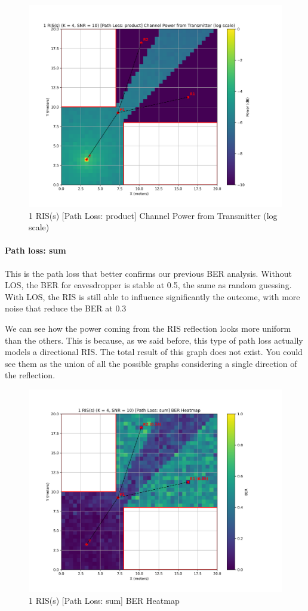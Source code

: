 \begin{figure}[H]
  \centering
  \includegraphics[width=0.7\linewidth]{imgs/heatmap-simulations/1 RIS(s) (K = 4, SNR = 10) [Path Loss_ product] Channel Power from Transmitter (log scale).png}
  \caption{1 RIS(s) [Path Loss: product] Channel Power from Transmitter (log scale)}
\end{figure}

\paragraph*{Path loss: sum}
This is the path loss that better confirms our previous BER analysis. Without LOS, the BER for eavesdropper is stable at 0.5, the same as random guessing. With LOS, the RIS is still able to influence significantly the outcome, with more noise that reduce the BER at 0.3

We can see how the power coming from the RIS reflection looks more uniform than the others. This is because, as we said before, this type of path loss actually models a directional RIS. The total result of this graph does not exist. You could see them as the union of all the possible graphs considering a single direction of the reflection.

\begin{figure}[H]
  \centering
  \includegraphics[width=0.7\linewidth]{imgs/heatmap-simulations/1 RIS(s) (K = 4, SNR = 10) [Path Loss_ sum] BER Heatmap.png}
  \caption{1 RIS(s) [Path Loss: sum] BER Heatmap}
\end{figure}


